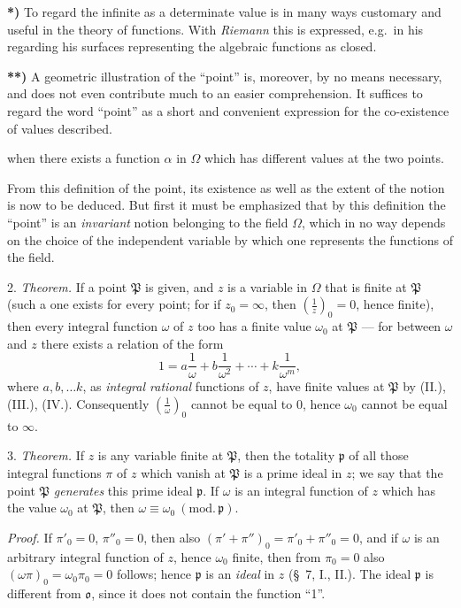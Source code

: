 \documentclass{article}
\begin{document}
\textbf{*)} To regard the infinite as a determinate value is in many ways customary and useful in the theory of functions. With \emph{Riemann} this is expressed, e.g.\ in his regarding his surfaces representing the algebraic functions as closed.

\textbf{**)} A geometric illustration of the ``point'' is, moreover, by no means necessary, and does not even contribute much to an easier comprehension. It suffices to regard the word ``point'' as a short and convenient expression for the co-existence of values described.

when there exists a function $\alpha$ in $\Omega$ which has different values at the two points.

From this definition of the point, its existence as well as the extent of the notion is now to be deduced. But first it must be emphasized that by this definition the ``point'' is an \emph{invariant} notion belonging to the field $\Omega$, which in no way depends on the choice of the independent variable by which one represents the functions of the field.

2. \emph{Theorem.} If a point $\mathfrak{P}$ is given, and $z$ is a variable in $\Omega$ that is finite at $\mathfrak{P}$ (such a one exists for every point; for if $z_{0} = \infty$, then $\left(\frac{1}{z}\right)_{0} = 0$, hence finite), then every integral function $\omega$ of $z$ too has a finite value $\omega_{0}$ at $\mathfrak{P}$ --- for between $\omega$ and $z$ there exists a relation of the form
\[ 1 = a\frac{1}{\omega} + b\frac{1}{\omega^{2}} + \cdots + k\frac{1}{\omega^{m}}, \]
where $a, b, \ldots k$, as \emph{integral rational} functions of $z$, have finite values at $\mathfrak{P}$ by (II.), (III.), (IV.). Consequently $\left(\frac{1}{\omega}\right)_{0}$ cannot be equal to 0, hence $\omega_{0}$ cannot be equal to $\infty$.

3. \emph{Theorem.} If $z$ is any variable finite at $\mathfrak{P}$, then the totality $\mathfrak{p}$ of all those integral functions $\pi$ of $z$ which vanish at $\mathfrak{P}$ is a prime ideal in $z$; we say that the point $\mathfrak{P}$ \emph{generates} this prime ideal $\mathfrak{p}$. If $\omega$ is an integral function of $z$ which has the value $\omega_{0}$ at $\mathfrak{P}$, then $\omega \equiv \omega_{0} \ (\text{mod.}\,\mathfrak{p})$.

\emph{Proof.} If $\pi'_{0} = 0$, $\pi''_{0} = 0$, then also $(\pi' + \pi'')_{0} = \pi'_{0} + \pi''_{0} = 0$, and if $\omega$ is an arbitrary integral function of $z$, hence $\omega_{0}$ finite, then from $\pi_{0} = 0$ also $(\omega\pi)_{0} = \omega_{0}\pi_{0} = 0$ follows; hence $\mathfrak{p}$ is an \emph{ideal} in $z$ (§~7, I., II.). The ideal $\mathfrak{p}$ is different from $\mathfrak{o}$, since it does not contain the function ``1''.
\end{document}
